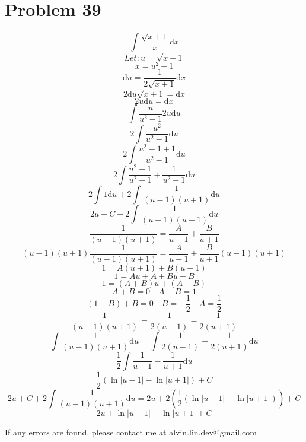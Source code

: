 \documentclass[letterpaper, 12pt]{article}
\newcommand*{\diff}{\mathrm{d}}
\begin{document}
\section*{Problem 39}
\[ \int{\frac{\sqrt{x+1}}{x}\diff{x}} \]
\[ Let: u = \sqrt{x+1} \]
\[ x = u^{2}-1 \]
\[ \diff{u} = \frac{1}{2\sqrt{x+1}}\diff{x} \]
\[ 2\diff{u}\sqrt{x+1} = \diff{x} \]
\[ 2u\diff{u} = \diff{x} \]
\[ \int{\frac{u}{u^{2}-1}2u\diff{u}} \]
\[ 2\int{\frac{u^{2}}{u^{2}-1}\diff{u}} \]
\[ 2\int{\frac{u^{2}-1+1}{u^{2}-1}\diff{u}} \]
\[ 2\int{\frac{u^{2}-1}{u^{2}-1}+\frac{1}{u^{2}-1}\diff{u}} \]
\[ 2\int{1\diff{u}}+2\int{\frac{1}{(u-1)(u+1)}\diff{u}} \]
\[ 2u+C+2\int{\frac{1}{(u-1)(u+1)}\diff{u}} \]
\[ \frac{1}{(u-1)(u+1)} = \frac{A}{u-1}+\frac{B}{u+1} \]
\[ (u-1)(u+1)\frac{1}{(u-1)(u+1)} = \frac{A}{u-1}+\frac{B}{u+1}(u-1)(u+1) \]
\[ 1 = A(u+1)+B(u-1) \]
\[ 1 = Au+A+Bu-B \]
\[ 1 = (A+B)u+(A-B) \]
\[ A+B = 0 \quad A-B = 1 \]
\[ (1+B)+B = 0 \quad B = -\frac{1}{2} \quad A = \frac{1}{2} \]
\[ \frac{1}{(u-1)(u+1)} = \frac{1}{2(u-1)}-\frac{1}{2(u+1)} \]
\[ \int{\frac{1}{(u-1)(u+1)}\diff{u}} =
   \int{\frac{1}{2(u-1)}-\frac{1}{2(u+1)}\diff{u}} \]
\[ \frac{1}{2}\int{\frac{1}{u-1}-\frac{1}{u+1}\diff{u}} \]
\[ \frac{1}{2}(\ln|u-1|-\ln|u+1|)+C \]
\[ 2u+C+2\int{\frac{1}{(u-1)(u+1)}\diff{u}} =
   2u+2(\frac{1}{2}(\ln|u-1|-\ln|u+1|))+C \]
\[ 2u+\ln|u-1|-\ln|u+1|+C \]

\begin{center}
  If any errors are found, please contact me at alvin.lin.dev@gmail.com
\end{center}
\end{document}
